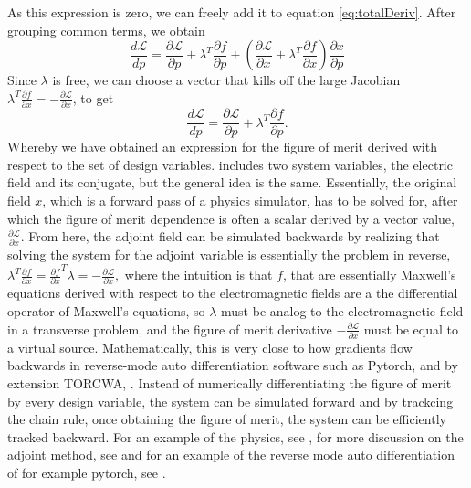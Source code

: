 As this expression is zero, we can freely add it to equation \ref{eq:totalDeriv}. After grouping common terms, we obtain
\begin{equation}
\label{eq:lagrangian}
\frac{d\mathcal{L}}{dp} = \frac{\partial \mathcal{L}}{\partial p} + \lambda^T \frac{\partial f}{\partial p} + \left( \frac{\partial \mathcal{L}}{\partial x} + \lambda^T \frac{\partial f}{\partial x} \right) \frac{\partial x}{\partial p}
\end{equation}
Since $\lambda$ is free, we can choose a vector that kills off the large Jacobian $\lambda^T\frac{\partial f}{\partial x} = -\frac{\partial \mathcal{L}}{\partial x} $,
to get
\begin{equation}
\label{eq:adjoint}
\frac{d\mathcal{L}}{dp} = \frac{\partial \mathcal{L}}{\partial p} + \lambda^T\frac{\partial f}{\partial p}.
\end{equation}
Whereby we have obtained an expression for the figure of merit derived with respect to the set of design variables. \cite{Hughes2018} includes two system variables, the electric field and its conjugate, but the general idea is the same.
Essentially, the original field $x$, which is a forward pass of a physics simulator, has to be solved for, after which the figure of merit dependence is often a scalar derived by a vector value, $\frac{\partial\mathcal{L}}{\partial x}$.
From here, the adjoint field can be simulated backwards by realizing that solving the system for the adjoint variable is essentially the problem in reverse,
$\lambda^T\frac{\partial f}{\partial x} =\frac{\partial f}{\partial x}^T\lambda = -\frac{\partial \mathcal{L} }{\partial x},$ where the intuition is that $f$, that are essentially Maxwell's equations derived with respect to the electromagnetic fields are a the differential operator of Maxwell's  equations, so 
$\lambda$ must be analog to the electromagnetic field in a transverse problem, and the figure of merit derivative $-\frac{\partial \mathcal{L}}{\partial x}$ must be equal to a virtual source. 
Mathematically, this is very close to how gradients flow backwards in reverse-mode auto differentiation software such as Pytorch, and 
by extension TORCWA, \cite{torcwa}. Instead of numerically differentiating the figure of merit by every design variable, the system can be simulated forward and by trackcing the chain rule, once obtaining the figure of merit, the system can be efficiently tracked backward.
For an example of the physics, see \cite{Hughes2018}, for more discussion on the adjoint method, see \cite{Hughes2019} and for an example of the reverse mode auto differentiation of for example pytorch, see \cite{torcwa}.

